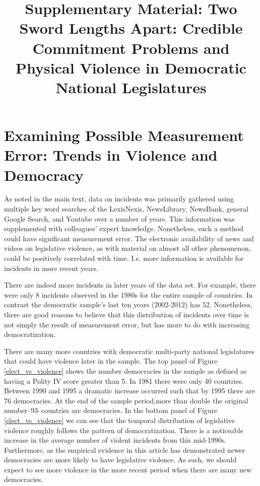 \documentclass[a4paper]{article}\usepackage[]{graphicx}\usepackage[]{color}
\title{Supplementary Material: Two Sword Lengths Apart: Credible Commitment Problems and Physical Violence in Democratic National Legislatures}
\begin{document}
\maketitle



\section*{Examining Possible Measurement Error: Trends in Violence and Democracy}


As noted in the main text, data on incidents was primarily gathered using multiple key word searches of the LexisNexis, NewsLibrary, NewsBank, general Google Search, and Youtube over a number of years. This information was supplemented with colleagues' expert knowledge. Nonetheless, such a method could have significant measurement error. The electronic availability of news and videos on legislative violence, as with material on almost all other phenomenon, could be positively correlated with time. I.e. more information is available for incidents in more recent years.

There are indeed more incidents in later years of the data set. For example, there were only 8 incidents observed in the 1980s for the entire sample of countries. In contrast the democratic sample's last ten years (2002-2012) has 52. Nonetheless, there are good reasons to believe that this distribution of incidents over time is not simply the result of measurement error, but has more to do with increasing democratization.

There are many more countries with democratic multi-party national legislatures that could have violence later in the sample. The top panel of Figure \ref{elect_vs_violence} shows the number democracies in the sample as defined as having a Polity IV score greater than 5. In 1981 there were only 40 countries. Between 1990 and 1995 a dramatic increase occurred such that by 1995 there are 76 democracies. At the end of the sample period,more than double the original number--93--countries are democracies. In the bottom panel of Figure \ref{elect_vs_violence} we can see that the temporal distribution of legislative violence roughly follows the pattern of democratization. There is a noticeable increase in the average number of violent incidents from this mid-1990s. Furthermore, as the empirical evidence in this article has demonstrated newer democracies are more likely to have legislative violence. As such, we should expect to see more violence in the more recent period when there are many new democracies.
\end{document}
